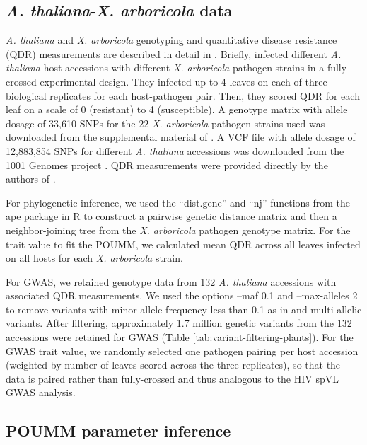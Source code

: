 \documentclass[11pt]{article}
\begin{document}
\begin{linenumbers}
\subsection*{\emph{A. thaliana}-\emph{X. arboricola} data}
\emph{A. thaliana} and \emph{X. arboricola} genotyping and quantitative disease resistance (QDR) measurements are described in detail in \citep{Wang2018Two-wayGenomes}. Briefly, \citep{Wang2018Two-wayGenomes} infected different \emph{A. thaliana} host accessions with different \emph{X. arboricola} pathogen strains in a fully-crossed experimental design. They infected up to 4 leaves on each of three biological replicates for each host-pathogen pair. Then, they scored QDR for each leaf on a scale of 0 (resistant) to 4 (susceptible). A genotype matrix with allele dosage of 33,610 SNPs for the 22 \emph{X. arboricola} pathogen strains used was downloaded from the supplemental material of \citep{Wang2018Two-wayGenomes}. A VCF file with allele dosage of 12,883,854 SNPs for different \emph{A. thaliana} accessions was downloaded from the 1001 Genomes project \citep{Alonso-Blanco20161135Thaliana}. QDR measurements were provided directly by the authors of \citep{Wang2018Two-wayGenomes}.

For phylogenetic inference, we used the ``dist.gene'' and ``nj'' functions from the ape package in R to construct a pairwise genetic distance matrix and then a neighbor-joining tree from the \emph{X. arboricola} pathogen genotype matrix. For the trait value to fit the POUMM, we calculated mean QDR across all leaves infected on all hosts for each \emph{X. arboricola} strain.

For GWAS, we retained genotype data from 132 \emph{A. thaliana} accessions with associated QDR measurements. We used the options --maf 0.1 and --max-alleles 2 to remove variants with minor allele frequency less than 0.1 as in \citep{Wang2018Two-wayGenomes} and multi-allelic variants. After filtering, approximately 1.7 million genetic variants from the 132 accessions were retained for GWAS (Table \ref{tab:variant-filtering-plants}). For the GWAS trait value, we randomly selected one pathogen pairing per host accession (weighted by number of leaves scored across the three replicates), so that the data is paired rather than fully-crossed and thus analogous to the HIV spVL GWAS analysis.

\subsection*{POUMM parameter inference}


\end{linenumbers}
\end{document}
